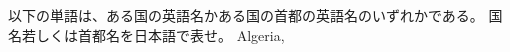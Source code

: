\documentclass{jarticle}
\begin{document}
\vspace*{\fill}
\begin{center}
以下の単語は、ある国の英語名かある国の首都の英語名のいずれかである。
国名若しくは首都名を日本語で表せ。
Algeria, 
\end{center}
\vspace*{\fill}
\end{document}
